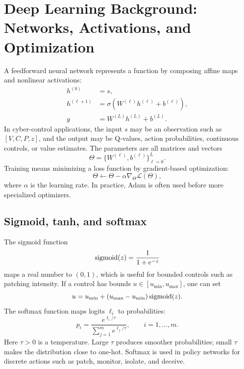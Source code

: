 \documentclass[11pt,a4paper]{article}
\begin{document}
\section{Deep Learning Background: Networks, Activations, and Optimization}\label{app:dl-background}
A feedforward neural network represents a function by composing affine maps and nonlinear activations:
\begin{align}
    h^{(0)} &= s,\\
    h^{(\ell+1)} &= \sigma\left(W^{(\ell)}h^{(\ell)}+b^{(\ell)}\right),\\
    y &= W^{(L)}h^{(L)}+b^{(L)}.
\end{align}
In cyber-control applications, the input $s$ may be an observation such as $[V,C,P,z]$, and the output may be Q-values, action probabilities, continuous controls, or value estimates. The parameters are all matrices and vectors
\begin{equation}
    \Theta=\{W^{(\ell)},b^{(\ell)}\}_{\ell=0}^{L}.
\end{equation}
Training means minimizing a loss function by gradient-based optimization:
\begin{equation}
    \Theta\leftarrow \Theta-\alpha \nabla_\Theta \mathcal{L}(\Theta),
\end{equation}
where $\alpha$ is the learning rate. In practice, Adam is often used before more specialized optimizers.

\subsection{Sigmoid, tanh, and softmax}
The sigmoid function
\begin{equation}
    \operatorname{sigmoid}(z)=\frac{1}{1+e^{-z}}
\end{equation}
maps a real number to $(0,1)$, which is useful for bounded controls such as patching intensity. If a control has bounds $u\in[u_{\min},u_{\max}]$, one can set
\begin{equation}
    u=u_{\min}+(u_{\max}-u_{\min})\operatorname{sigmoid}(z).
\end{equation}
The softmax function maps logits $\ell_i$ to probabilities:
\begin{equation}
    p_i=\frac{e^{\ell_i/\tau}}{\sum_{j=1}^m e^{\ell_j/\tau}},\qquad i=1,\ldots,m.
\end{equation}
Here $\tau>0$ is a temperature. Large $\tau$ produces smoother probabilities; small $\tau$ makes the distribution close to one-hot. Softmax is used in policy networks for discrete actions such as patch, monitor, isolate, and deceive.
\end{document}
